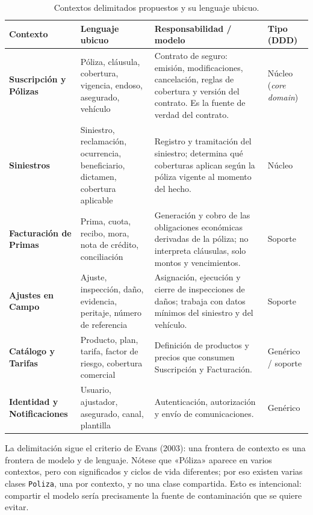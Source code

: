 \documentclass[11pt,a4paper]{article}
\begin{document}
\begin{table}[htbp]
\centering
\footnotesize
\setlength{\tabcolsep}{4pt}
\renewcommand{\arraystretch}{1.25}
\begin{tabular}{@{}>{\raggedright\arraybackslash}p{2.7cm}>{\raggedright\arraybackslash}p{3.9cm}>{\raggedright\arraybackslash}p{5.1cm}>{\raggedright\arraybackslash}p{2.9cm}@{}}
\toprule
\textbf{Contexto} & \textbf{Lenguaje ubicuo} & \textbf{Responsabilidad / modelo} & \textbf{Tipo (DDD)} \\
\midrule
\textbf{Suscripción y Pólizas} &
Póliza, cláusula, cobertura, vigencia, endoso, asegurado, vehículo &
Contrato de seguro: emisión, modificaciones, cancelación, reglas de cobertura y versión del contrato. Es la fuente de verdad del contrato. &
Núcleo (\emph{core domain}) \\
\addlinespace
\textbf{Siniestros} &
Siniestro, reclamación, ocurrencia, beneficiario, dictamen, cobertura aplicable &
Registro y tramitación del siniestro; determina qué coberturas aplican según la póliza vigente al momento del hecho. &
Núcleo \\
\addlinespace
\textbf{Facturación de Primas} &
Prima, cuota, recibo, mora, nota de crédito, conciliación &
Generación y cobro de las obligaciones económicas derivadas de la póliza; no interpreta cláusulas, solo montos y vencimientos. &
Soporte \\
\addlinespace
\textbf{Ajustes en Campo} &
Ajuste, inspección, daño, evidencia, peritaje, número de referencia &
Asignación, ejecución y cierre de inspecciones de daños; trabaja con datos mínimos del siniestro y del vehículo. &
Soporte \\
\addlinespace
\textbf{Catálogo y Tarifas} &
Producto, plan, tarifa, factor de riesgo, cobertura comercial &
Definición de productos y precios que consumen Suscripción y Facturación. &
Genérico / soporte \\
\addlinespace
\textbf{Identidad y Notificaciones} &
Usuario, ajustador, asegurado, canal, plantilla &
Autenticación, autorización y envío de comunicaciones. &
Genérico \\
\bottomrule
\end{tabular}
\caption{Contextos delimitados propuestos y su lenguaje ubicuo.}
\end{table}

La delimitación sigue el criterio de Evans (2003): una frontera de contexto es una frontera
de modelo y de lenguaje. Nótese que «Póliza» aparece en varios contextos, pero con
significados y ciclos de vida diferentes; por eso existen varias clases \texttt{Poliza},
una por contexto, y no una clase compartida. Esto es intencional: compartir el modelo
sería precisamente la fuente de contaminación que se quiere evitar.
\end{document}
